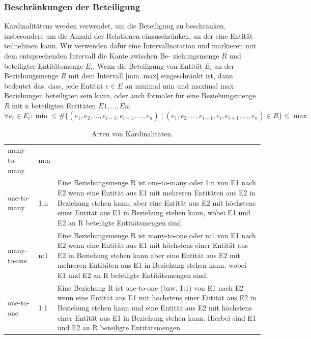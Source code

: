 \subsubsection*{Beschränkungen der Beteiligung}
\begin{mybox}[title=Kardinalitäten in Intervallnotation]
\Glspl{Kardinalitäten} werden verwendet, um die Beteiligung zu beschränken, insbesondere um die Anzahl der Relationen einzuschränken, an der eine Entität teilnehmen kann. Wir verwenden dafür
eine \Gls{Intervallnotation} und markieren mit dem entsprechenden Intervall die Kante zwischen Be-
ziehungsmenge $R$ und beteiligter Entitätsmenge $E_i$. Wenn die Beteiligung von Entität $E_i$ an der Beziehungsmenge $R$ mit dem Intervall [min..max] eingeschränkt ist, dann bedeutet das, dass, jede Entität $e \in E$ an minimal min und maximal max Beziehungen beteiligten sein kann, oder auch formaler für eine Beziehungsmenge $R$ mit n beteiligten Entitäten $E1, ..., En$:
\begin{equation}
\forall e_i \in E_i : \min \leq \#\{(e_1, e_2, \dots, e_{i-1}, e_{i+1}, \dots, e_n) \mid (e_1, e_2, \dots, e_{i-1}, e_i, e_{i+1}, \dots, e_n) \in R\} \leq \max
\end{equation}
\end{mybox}
\begin{table}[H]
    \centering
    \begin{tabular}{l l p{10cm}}
        many-to-many &  m:n & \\
        one-to-many & 1:n & Eine Beziehungsmenge R ist one-to-many oder 1:n von E1 nach E2 wenn eine Entität aus E1 mit mehreren Entitäten aus E2 in Beziehung stehen kann, aber eine Entität aus E2 mit höchstens einer Entität aus E1 in Beziehung stehen kann, wobei E1 und E2 an R beteiligte Entitätsmengen sind. \\
        many-to-one & n:1 & Eine Beziehungsmenge R ist many-to-one oder n:1 von E1 nach E2 wenn eine Entität aus E1 mit höchstens einer Entität aus E2 in Beziehung stehen kann aber eine Entität aus E2 mit mehreren Entitäten aus E1 in Beziehung stehen kann, wobei E1 und E2 an R beteiligte Entitätsmengen sind. \\
        one-to-one & 1:1 & Eine Beziehung R ist one-to-one (bzw. 1:1) von E1 nach E2 wenn eine Entität aus E1 mit höchstens einer Entität aus E2 in Beziehung stehen kann und eine Entität aus E2 mit höchstens einer Entität aus E1 in Beziehung stehen kann. Hierbei sind E1 und E2 an R beteiligte Entitätsmengen.
    \end{tabular}
    \caption{Arten von Kardinalitäten.}
    \label{tab:kardinalitäten}
\end{table} \noindent
